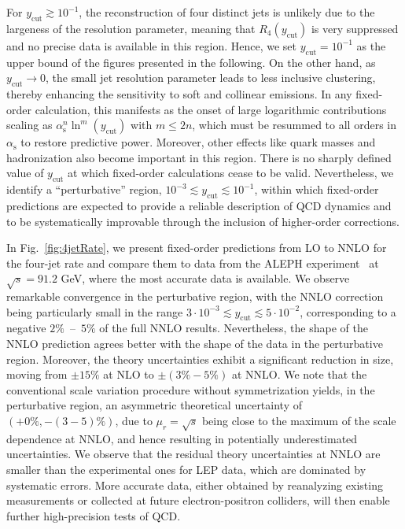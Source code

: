 \documentclass[10pt,aps,prl,superscriptaddress,twocolumn,preprintnumbers,nofootinbib]{revtex4-2}
\newcommand{\ycut}{y_{\mathrm{cut}}}
\newcommand{\alphas}{\alpha_{\mathrm{s}}}
\begin{document}
For $\ycut\gtrsim 10^{-1}$, the reconstruction of four distinct jets is unlikely due to the largeness of the resolution parameter, meaning that $R_4(\ycut)$ is very suppressed and no precise data is available in this region. Hence, we set \mbox{$\ycut= 10^{-1}$} as the upper bound of the figures presented in the following. On the other hand, as $\ycut\to 0$, the small jet resolution parameter leads to less inclusive clustering, thereby enhancing the sensitivity to soft and collinear emissions. In any fixed-order calculation, this manifests as the onset of large logarithmic contributions scaling as $\alphas^n\ln^{m}(\ycut)$ with $m\leq 2n$, which must be resummed to all orders in $\alphas$ to restore predictive power. Moreover, other effects like quark masses and hadronization also become important in this region. There is no sharply defined value of $\ycut$  at which fixed-order calculations cease to be valid. Nevertheless, we identify a ``perturbative'' region, $10^{-3} \lesssim  \ycut \lesssim 10^{-1}$, within which fixed-order predictions are expected to provide a reliable description of QCD dynamics and to be systematically improvable through the inclusion of higher-order corrections.

In Fig.~\ref{fig:4jetRate}, we present fixed-order predictions from LO to NNLO for the four-jet rate and compare them to data from the ALEPH experiment~\cite{ALEPH:2003obs} at $\sqrt{s}=91.2$ GeV, where the most accurate data is available. We observe remarkable convergence in the perturbative region, with the NNLO correction being particularly small in the range $3\cdot10^{-3} \lesssim \ycut \lesssim 5\cdot10^{-2}$, corresponding to a negative $2\%$~--~$5\%$ of the full NNLO results. Nevertheless, the shape of the NNLO prediction agrees better with the shape of the data in the perturbative region. Moreover, the theory uncertainties exhibit a significant reduction in size, moving from $\pm15\%$ at NLO to $\pm(3\%-5\%)$ at NNLO.  We note that the conventional scale variation procedure without symmetrization yields, in the perturbative region, an asymmetric theoretical uncertainty of $(+0\%,-(3-5)\%)$, due to $\mu_r=\sqrt{s}$ being close to the maximum of the scale dependence at NNLO, and hence resulting in potentially underestimated uncertainties.
We observe that the residual theory uncertainties at NNLO are smaller than the experimental ones for LEP data, which are dominated by systematic errors. More accurate data, either obtained by reanalyzing existing measurements or collected at future electron-positron colliders, will then enable further high-precision tests of QCD.
\end{document}
